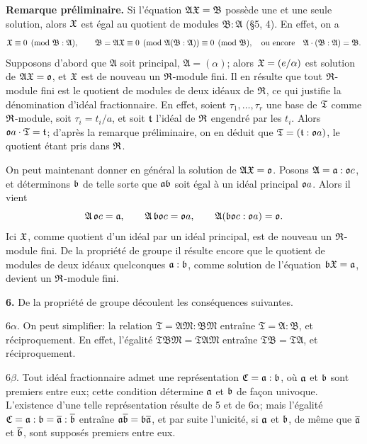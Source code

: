 \textbf{Remarque préliminaire.} Si l'équation $\mathfrak A\mathfrak{X}=\mathfrak B$ possède une et une seule solution, alors $\mathfrak{X}$ est égal au quotient de modules $\mathfrak B:\mathfrak A$ (\S{}5, 4). En effet, on a
\[
        \mathfrak{X}\equiv0\pmod{\mathfrak B:\mathfrak A},
        \qquad
        \mathfrak B=\mathfrak A\mathfrak{X}\equiv0\pmod{\mathfrak A(\mathfrak B:\mathfrak A)}\equiv0\pmod{\mathfrak B},
        \quad\text{ou encore}\quad
        \mathfrak A\cdot(\mathfrak B:\mathfrak A)=\mathfrak B.
\]
Supposons d'abord que $\mathfrak A$ soit principal, $\mathfrak A=(\alpha)$; alors $\mathfrak{X}=(e/\alpha)$ est solution de $\mathfrak A\mathfrak{X}=\mathfrak{o}$, et $\mathfrak{X}$ est de nouveau un $\mathfrak{R}$-module fini. Il en résulte que tout $\mathfrak{R}$-module fini est le quotient de modules de deux idéaux de $\mathfrak{R}$, ce qui justifie la dénomination d'idéal fractionnaire. En effet, soient $\tau_1,\ldots,\tau_r$ une base de $\mathfrak{T}$ comme $\mathfrak{R}$-module, soit $\tau_i=t_i/a$, et soit $\mathfrak{t}$ l'idéal de $\mathfrak{R}$ engendré par les $t_i$. Alors $\mathfrak{o} a\cdot\mathfrak{T}=\mathfrak{t}$; d'après la remarque préliminaire, on en déduit que $\mathfrak{T}=(\mathfrak{t}:\mathfrak{o} a)$, le quotient étant pris dans $\mathfrak{R}$.

On peut maintenant donner en général la solution de $\mathfrak A\mathfrak{X}=\mathfrak{o}$. Posons $\mathfrak A=\mathfrak{a}:\mathfrak{o} c$, et déterminons $\mathfrak{b}$ de telle sorte que $\mathfrak{a}\mathfrak{b}$ soit égal à un idéal principal $\mathfrak{o} a$. Alors il vient
\[
        \mathfrak A\,\mathfrak{o} c=\mathfrak{a},
        \qquad \mathfrak A\,\mathfrak{b}\mathfrak{o} c=\mathfrak{o} a,
        \qquad \mathfrak A(\mathfrak{b}\mathfrak{o} c:\mathfrak{o} a)=\mathfrak{o}.
\]
Ici $\mathfrak{X}$, comme quotient d'un idéal par un idéal principal, est de nouveau un $\mathfrak{R}$-module fini. De la propriété de groupe il résulte encore que le quotient de modules de deux idéaux quelconques $\mathfrak{a}:\mathfrak{b}$, comme solution de l'équation $\mathfrak{b}\mathfrak{X}=\mathfrak{a}$, devient un $\mathfrak{R}$-module fini.

\textbf{6.} De la propriété de groupe découlent les conséquences suivantes.

6$\alpha$. On peut simplifier: la relation $\mathfrak T=\mathfrak A\mathfrak M:\mathfrak B\mathfrak M$ entraîne $\mathfrak T=\mathfrak A:\mathfrak B$, et réciproquement. En effet, l'égalité $\mathfrak T\mathfrak B\mathfrak M=\mathfrak T\mathfrak A\mathfrak M$ entraîne $\mathfrak T\mathfrak B=\mathfrak T\mathfrak A$, et réciproquement.

6$\beta$. Tout idéal fractionnaire admet une représentation $\mathfrak C=\mathfrak{a}:\mathfrak{b}$, où $\mathfrak{a}$ et $\mathfrak{b}$ sont premiers entre eux; cette condition détermine $\mathfrak{a}$ et $\mathfrak{b}$ de façon univoque. L'existence d'une telle représentation résulte de 5 et de 6$\alpha$; mais l'égalité $\mathfrak C=\mathfrak{a}:\mathfrak{b}=\overline{\mathfrak{a}}:\overline{\mathfrak{b}}$ entraîne $\mathfrak{a}\overline{\mathfrak{b}}=\mathfrak{b}\overline{\mathfrak{a}}$, et par suite l'unicité, si $\mathfrak{a}$ et $\mathfrak{b}$, de même que $\overline{\mathfrak{a}}$ et $\overline{\mathfrak{b}}$, sont supposés premiers entre eux.

